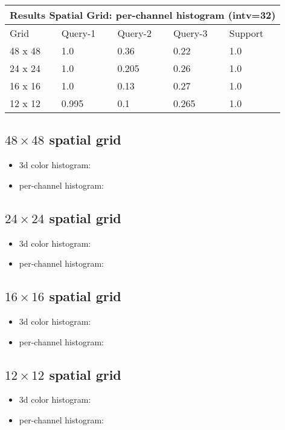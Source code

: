 \documentclass[12pt]{article}
\begin{document}
\vspace*{1cm}

\begin{tabular}{ |p{1.5cm}||p{2cm}|p{2cm}|p{2cm}|p{2cm}|  }
    \hline
    \multicolumn{5}{|c|}{Results Spatial Grid: per-channel histogram (intv=32)} \\
    \hline
    Grid & Query-1 & Query-2 & Query-3 & Support \\
    \hline
    48 x 48 & 1.0 & 0.36 & 0.22 & 1.0 \\
    \hline
    24 x 24 & 1.0 & 0.205 & 0.26 & 1.0 \\
    \hline
    16 x 16 & 1.0 & 0.13 & 0.27 & 1.0 \\
    \hline
    12 x 12 & 0.995 & 0.1 & 0.265 & 1.0 \\
    \hline
\end{tabular}

\subsection{$48\times48$ spatial grid}
\begin{itemize}
\item 3d color histogram:
\item per-channel histogram:
\end{itemize}

\subsection{$24\times24$ spatial grid}
\begin{itemize}
\item 3d color histogram:
\item per-channel histogram:
\end{itemize}

\subsection{$16\times16$ spatial grid}
\begin{itemize}
\item 3d color histogram:
\item per-channel histogram:
\end{itemize}

\subsection{$12\times12$ spatial grid}
\begin{itemize}
\item 3d color histogram:
\item per-channel histogram:
\end{itemize}
\end{document}
